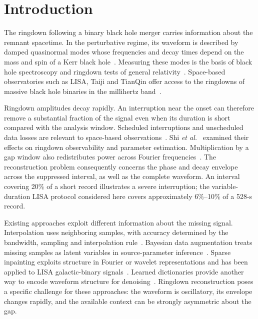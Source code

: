 \documentclass[10pt,prd,aps,a4paper,twocolumn,superscriptaddress,nofootinbib,floatfix]{revtex4-2}
\begin{document}
\maketitle
\section{Introduction}
The ringdown following a binary black hole merger carries information about the remnant spacetime. In the perturbative regime, its waveform is described by damped quasinormal modes whose frequencies and decay times depend on the mass and spin of a Kerr black hole~\cite{berti2006gravitational,berti2009qnm}. Measuring these modes is the basis of black hole spectroscopy and ringdown tests of general relativity~\cite{Isi_2019}. Space-based observatories such as LISA, Taiji and TianQin offer access to the ringdowns of massive black hole binaries in the millihertz band~\cite{amaroseoane2017laserinterferometerspaceantenna,robson2019construction,Ruan2020,Luo2016}.

Ringdown amplitudes decay rapidly. An interruption near the onset can therefore remove a substantial fraction of the signal even when its duration is short compared with the analysis window. Scheduled interruptions and unscheduled data losses are relevant to space-based observations~\cite{Baghi2019,dey2021gaps}. Shi \textit{et al.}~\cite{shi2024effectsdatagapsringdown} examined their effects on ringdown observability and parameter estimation. Multiplication by a gap window also redistributes power across Fourier frequencies~\cite{Harris1978}. The reconstruction problem consequently concerns the phase and decay envelope across the suppressed interval, as well as the complete waveform. An interval covering 20\% of a short record illustrates a severe interruption; the variable-duration LISA protocol considered here covers approximately 6\%--10\% of a 528-s record.

Existing approaches exploit different information about the missing signal. Interpolation uses neighboring samples, with accuracy determined by the bandwidth, sampling and interpolation rule~\cite{Horowitz1974,Maeland1988,Unser1999}. Bayesian data augmentation treats missing samples as latent variables in source-parameter inference~\cite{Baghi2019}. Sparse inpainting exploits structure in Fourier or wavelet representations and has been applied to LISA galactic-binary signals~\cite{Blelly2021,Starck2010}. Learned dictionaries provide another way to encode waveform structure for denoising~\cite{TorresForne2016}. Ringdown reconstruction poses a specific challenge for these approaches: the waveform is oscillatory, its envelope changes rapidly, and the available context can be strongly asymmetric about the gap.
\end{document}
